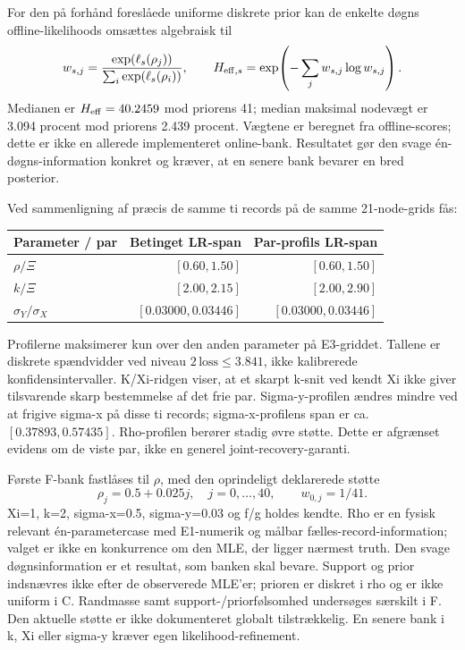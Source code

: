 For den på forhånd foreslåede uniforme diskrete prior kan de enkelte døgns
offline-likelihoods omsættes algebraisk til
\[
 w_{s,j}=\frac{\exp(\ell_s(\rho_j))}{\sum_i\exp(\ell_s(\rho_i))},\qquad
 H_{{\rm eff},s}=\exp\!\left(-\sum_jw_{s,j}\log w_{s,j}\right).
\]
Medianen er \(H_{\rm eff}=40.2459\) mod priorens 41; median maksimal nodevægt
er 3.094 procent mod priorens 2.439 procent. Vægtene er beregnet fra offline-scores;
dette er ikke en allerede implementeret online-bank. Resultatet gør den svage
én-døgns-information konkret og kræver, at en senere bank bevarer en bred posterior.

Ved sammenligning af præcis de samme ti records på de samme 21-node-grids fås:
\begin{center}
\small
\begin{tabular}{lrr}
\toprule
Parameter / par & Betinget LR-span & Par-profils LR-span \\
\midrule
\(\rho/\Xi\) & \([0.60,1.50]\) & \([0.60,1.50]\) \\
\(k/\Xi\) & \([2.00,2.15]\) & \([2.00,2.90]\) \\
\(\sigma_Y/\sigma_X\) & \([0.03000,0.03446]\) & \([0.03000,0.03446]\) \\
\bottomrule
\end{tabular}
\end{center}
Profilerne maksimerer kun over den anden parameter på E3-griddet. Tallene er
diskrete spændvidder ved niveau \(2\,\mathrm{loss}\le3.841\), ikke kalibrerede
konfidensintervaller. K/Xi-ridgen viser, at et skarpt k-snit ved kendt Xi ikke
giver tilsvarende skarp bestemmelse af det frie par. Sigma-y-profilen ændres
mindre ved at frigive sigma-x på disse ti records; sigma-x-profilens span er
ca. \([0.37893,0.57435]\). Rho-profilen berører stadig øvre støtte.
Dette er afgrænset evidens om de viste par, ikke en generel joint-recovery-garanti.

Første F-bank fastlåses til \(\rho\), med den oprindeligt deklarerede støtte
\[
 \rho_j=0.5+0.025j,\quad j=0,\ldots,40,\qquad w_{0,j}=1/41.
\]
Xi=1, k=2, sigma-x=0.5, sigma-y=0.03 og f/g holdes kendte. Rho er en fysisk
relevant én-parametercase med E1-numerik og målbar fælles-record-information;
valget er ikke en konkurrence om den MLE, der ligger nærmest truth. Den svage
døgnsinformation er et resultat, som banken skal bevare. Support og prior
indsnævres ikke efter de observerede MLE'er; prioren er diskret i rho og er ikke
uniform i C. Randmasse samt support-/priorfølsomhed undersøges særskilt i F.
Den aktuelle støtte er ikke dokumenteret globalt tilstrækkelig. En senere bank
i k, Xi eller sigma-y kræver egen likelihood-refinement.

